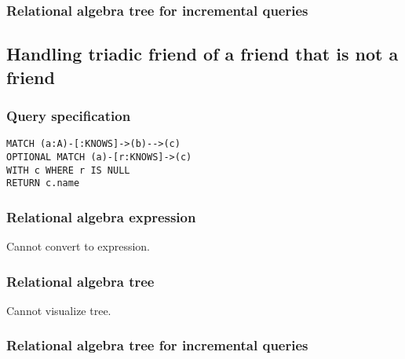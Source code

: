 \subsubsection*{Relational algebra tree for incremental queries}


\subsection{Handling triadic friend of a friend that is not a friend}

\subsubsection*{Query specification}

\begin{lstlisting}
MATCH (a:A)-[:KNOWS]->(b)-->(c)
OPTIONAL MATCH (a)-[r:KNOWS]->(c)
WITH c WHERE r IS NULL
RETURN c.name
\end{lstlisting}

\subsubsection*{Relational algebra expression}

Cannot convert to expression.

\subsubsection*{Relational algebra tree}

Cannot visualize tree.

\subsubsection*{Relational algebra tree for incremental queries}

